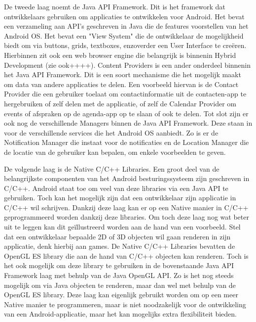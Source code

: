 De tweede laag noemt de Java API Framework. Dit is het framework dat ontwikkelaars gebruiken om applicaties te ontwikkelen voor Android. Het bevat een verzameling aan API's geschreven in Java die de features voorstellen van het Android OS. Het bevat een "View System" die de ontwikkelaar de mogelijkheid biedt om via buttons, grids, textboxes, enzoverder een User Interface te creëren. Hierbinnen zit ook een web browser engine die belangrijk is binnenin Hybrid Development (zie ook++++). Content Providers is een ander onderdeel binnenin het Java API Framework. Dit is een soort mechanisme die het mogelijk maakt om data van andere applicaties te delen. Een voorbeeld hiervan is de Contact Provider die een gebruiker toelaat om contactinformatie uit de contacten-app te hergebruiken of zelf delen met de applicatie, of zelf de Calendar Provider om events of afspraken op de agenda-app op te slaan of ook te delen. Tot slot zijn er ook nog de verschillende Managers binnen de Java API Framework. Deze staan in voor de verschillende services die het Android OS aanbiedt. Zo is er de Notification Manager die instaat voor de notificaties en de Location Manager die de locatie van de gebruiker kan bepalen, om enkele voorbeelden te geven.

De volgende laag is de Native C/C++ Libraries. Een groot deel van de belangrijkste componenten van het Android besturingssysteem zijn geschreven in C/C++. Android staat toe om veel van deze libraries via een Java API te gebruiken. Toch kan het mogelijk zijn dat een ontwikkelaar zijn applicatie in C/C++ wil schrijven. Dankzij deze laag kan er op een Native manier in C/C++ geprogrammeerd worden dankzij deze libraries. Om toch deze laag nog wat beter uit te leggen kan dit geïllustreerd worden aan de hand van een voorbeeld. Stel dat een ontwikkelaar bepaalde 2D of 3D objecten wil gaan renderen in zijn applicatie, denk hierbij aan games. De Native C/C++ Libraries bevatten de OpenGL ES library die aan de hand van C/C++ objecten kan renderen. Toch is het ook mogelijk om deze library te gebruiken in de bovenstaande Java API Framework laag met behulp van de Java OpenGL API. Zo is het nog steeds mogelijk om via Java objecten te renderen, maar dan wel met behulp van de OpenGL ES library. Deze laag kan eigenlijk gebruikt worden om op een meer Native manier te programmeren, maar is niet noodzakelijk voor de ontwikkeling van een Android-applicatie, maar het kan mogelijks extra flexibiliteit bieden.

